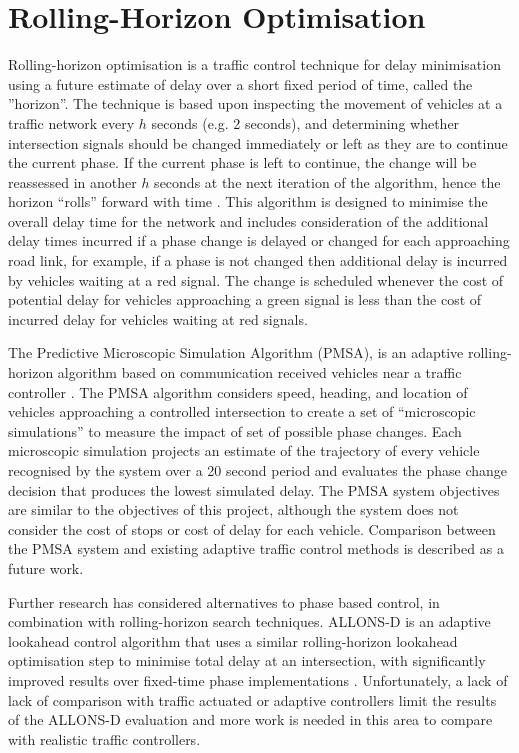 \section{Rolling-Horizon Optimisation}
\label{bg:rolling-horizon}

Rolling-horizon optimisation is a traffic control technique for delay minimisation using a future estimate of delay over a short fixed period of time, called the ''horizon''. The technique is based upon inspecting the movement of vehicles at a traffic network every $h$ seconds (e.g. 2 seconds), and determining whether intersection signals should be changed immediately or left as they are to continue the current phase. If the current phase is left to continue, the change will be reassessed in another $h$ seconds at the next iteration of the algorithm, hence the horizon ``rolls'' forward with time \cite{miller1963computer}. This algorithm is designed to minimise the overall delay time for the network and includes consideration of the additional delay times incurred if a phase change is delayed or changed for each approaching road link, for example, if a phase is not changed then additional delay is incurred by vehicles waiting at a red signal. The change is scheduled whenever the cost of potential delay for vehicles approaching a green signal is less than the cost of incurred delay for vehicles waiting at red signals.

The Predictive Microscopic Simulation Algorithm (PMSA), is an adaptive rolling-horizon algorithm based on communication received vehicles near a traffic controller \cite{smith2010intellidrive}. The PMSA algorithm considers speed, heading, and location of vehicles approaching a controlled intersection to create a set of ``microscopic simulations'' to measure the impact of set of possible phase changes. Each microscopic simulation projects an estimate of the trajectory of every vehicle recognised by the system over a 20 second period and evaluates the phase change decision that produces the lowest simulated delay. The PMSA system objectives are similar to the objectives of this project, although the system does not consider the cost of stops or cost of delay for each vehicle. Comparison between the PMSA system and existing adaptive traffic control methods is described as a future work.

Further research has considered alternatives to phase based control, in combination with rolling-horizon search techniques.  ALLONS-D is an adaptive lookahead control algorithm that uses a similar rolling-horizon lookahead optimisation step to minimise total delay at an intersection, with significantly improved results over fixed-time phase implementations \cite{porche1996allonsd}. Unfortunately, a lack of  lack of comparison with traffic actuated or adaptive controllers limit the results of the ALLONS-D evaluation and more work is needed in this area to compare with realistic traffic controllers. 

